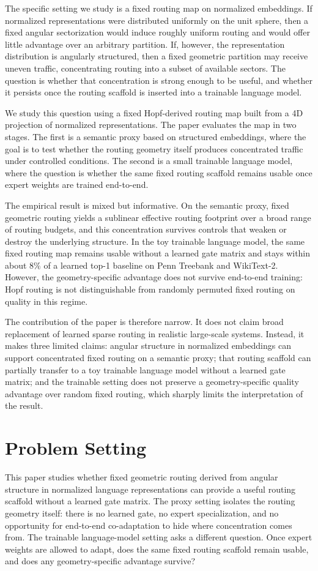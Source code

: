 \documentclass[10pt,twocolumn,letterpaper]{article}
\begin{document}
The specific setting we study is a fixed routing map on normalized embeddings. If normalized representations were distributed uniformly on the unit sphere, then a fixed angular sectorization would induce roughly uniform routing and would offer little advantage over an arbitrary partition. If, however, the representation distribution is angularly structured, then a fixed geometric partition may receive uneven traffic, concentrating routing into a subset of available sectors. The question is whether that concentration is strong enough to be useful, and whether it persists once the routing scaffold is inserted into a trainable language model.

We study this question using a fixed Hopf-derived routing map built from a 4D projection of normalized representations. The paper evaluates the map in two stages. The first is a semantic proxy based on structured embeddings, where the goal is to test whether the routing geometry itself produces concentrated traffic under controlled conditions. The second is a small trainable language model, where the question is whether the same fixed routing scaffold remains usable once expert weights are trained end-to-end.

The empirical result is mixed but informative. On the semantic proxy, fixed geometric routing yields a sublinear effective routing footprint over a broad range of routing budgets, and this concentration survives controls that weaken or destroy the underlying structure. In the toy trainable language model, the same fixed routing map remains usable without a learned gate matrix and stays within about \(8\%\) of a learned top-1 baseline on Penn Treebank and WikiText-2. However, the geometry-specific advantage does not survive end-to-end training: Hopf routing is not distinguishable from randomly permuted fixed routing on quality in this regime.

The contribution of the paper is therefore narrow. It does not claim broad replacement of learned sparse routing in realistic large-scale systems. Instead, it makes three limited claims: angular structure in normalized embeddings can support concentrated fixed routing on a semantic proxy; that routing scaffold can partially transfer to a toy trainable language model without a learned gate matrix; and the trainable setting does not preserve a geometry-specific quality advantage over random fixed routing, which sharply limits the interpretation of the result.

\newpage
\section{Problem Setting}
This paper studies whether fixed geometric routing derived from angular structure in normalized language representations can provide a useful routing scaffold without a learned gate matrix. The proxy setting isolates the routing geometry itself: there is no learned gate, no expert specialization, and no opportunity for end-to-end co-adaptation to hide where concentration comes from. The trainable language-model setting asks a different question. Once expert weights are allowed to adapt, does the same fixed routing scaffold remain usable, and does any geometry-specific advantage survive?
\end{document}
